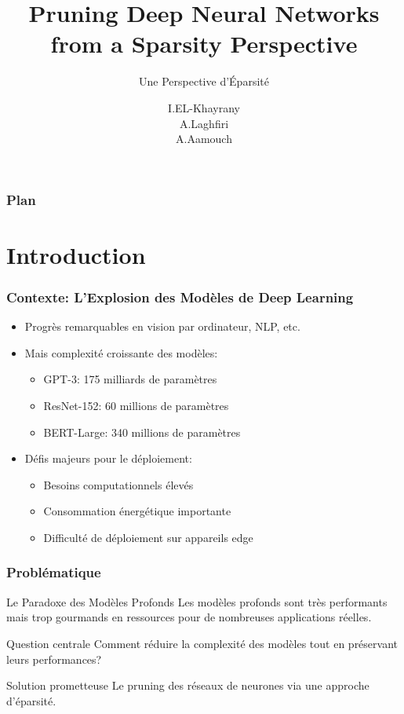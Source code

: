 \documentclass[10pt]{beamer}
\title{Pruning Deep Neural Networks from a Sparsity Perspective}
\subtitle{Une Perspective d'Éparsité}
\author{I.EL-Khayrany\\ A.Laghfiri\\A.Aamouch}
\institute{Université Ibn Zoher/FPO}
\begin{document}
\frame{\titlepage}

\begin{frame}
\frametitle{Plan}
\tableofcontents
\end{frame}

\section{Introduction}

\begin{frame}
\frametitle{Contexte: L'Explosion des Modèles de Deep Learning}
\begin{itemize}
    \item Progrès remarquables en vision par ordinateur, NLP, etc.
    \item Mais complexité croissante des modèles:
    \begin{itemize}
        \item GPT-3: 175 milliards de paramètres
        \item ResNet-152: 60 millions de paramètres
        \item BERT-Large: 340 millions de paramètres
    \end{itemize}
    \item Défis majeurs pour le déploiement:
    \begin{itemize}
        \item Besoins computationnels élevés
        \item Consommation énergétique importante
        \item Difficulté de déploiement sur appareils edge
    \end{itemize}
\end{itemize}
\end{frame}

\begin{frame}
\frametitle{Problématique}
\begin{block}{Le Paradoxe des Modèles Profonds}
Les modèles profonds sont très performants mais trop gourmands en ressources pour de nombreuses applications réelles.
\end{block}

\begin{exampleblock}{Question centrale}
Comment réduire la complexité des modèles tout en préservant leurs performances?
\end{exampleblock}

\begin{alertblock}{Solution prometteuse}
Le pruning des réseaux de neurones via une approche d'éparsité.
\end{alertblock}
\end{frame}
\end{document}

